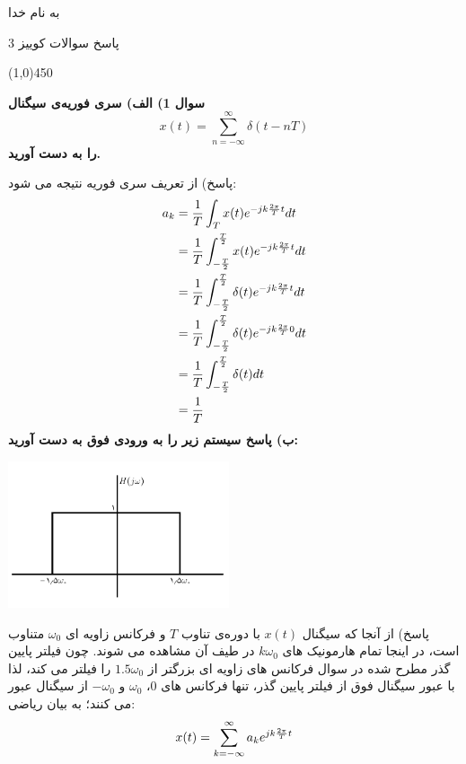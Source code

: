 \documentclass[50pt]{article}
\newcommand{\hl}{
\begin{center}
\line(1,0){450}
\end{center}}
\begin{document}
\setLTR 




\begin{RTL}
\Large{








\begin{center}
به نام خدا

پاسخ سوالات کوییز 3
\end{center}
\hl
\textbf{سوال 1) الف) سری فوریه‌ی سیگنال 
$$x(t)=\sum_{n=-\infty}^{\infty}\delta(t-nT)$$
را به دست آورید.}

پاسخ) از تعریف سری فوریه نتیجه می شود:
\[
\begin{split}
a_k&={1\over T}\int_{T}x(t)e^{-jk{2\pi\over T}t}dt
\\&={1\over T}\int_{-{T\over 2}}^{T\over 2}x(t)e^{-jk{2\pi\over T}t}dt
\\&={1\over T}\int_{-{T\over 2}}^{T\over 2}\delta(t)e^{-jk{2\pi\over T}t}dt
\\&={1\over T}\int_{-{T\over 2}}^{T\over 2}\delta(t)e^{-jk{2\pi\over T}0}dt
\\&={1\over T}\int_{-{T\over 2}}^{T\over 2}\delta(t)dt
\\&={1\over T}
\end{split}
\]
\textbf{ب) پاسخ سیستم زیر را به ورودی فوق به دست آورید:}
\begin{center}
\includegraphics[width=65mm]{m6}
\end{center}
پاسخ) از آنجا که سیگنال $x(t)$ با دوره‌ی تناوب $T$ و فرکانس زاویه ای $\omega_0$ متناوب است، در اینجا تمام هارمونیک های $k\omega_0$ در طیف آن مشاهده می شوند. چون فیلتر پایین گذر مطرح شده در سوال فرکانس های زاویه ای بزرگتر از $1.5\omega_0$ را فیلتر می کند، لذا با عبور سیگنال فوق از فیلتر پایین گذر، تنها فرکانس های $0$، $\omega_0$ و 
$-\omega_0$ 
 از سیگنال عبور می کنند؛ به بیان ریاضی:
\[
\begin{split}
x(t)=\sum_{k=-\infty}^{\infty} a_ke^{jk{2\pi\over T}t}
\end{split}
\] 
\[
\begin{split}

\end{split}\]}
\end{RTL}
\end{document}
